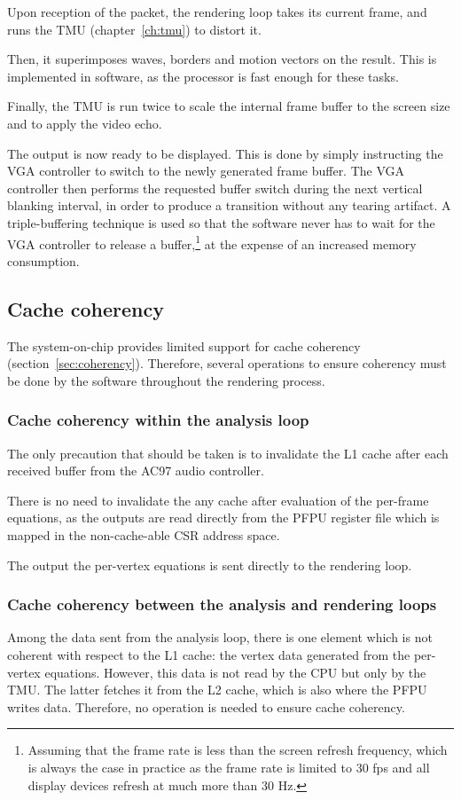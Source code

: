 \documentclass[a4paper,11pt]{kthesis}
\begin{document}
Upon reception of the packet, the rendering loop takes its current frame, and runs the TMU (chapter~\ref{ch:tmu}) to distort it.

Then, it superimposes waves, borders and motion vectors on the result. This is implemented in software, as the processor is fast enough for these tasks.

Finally, the TMU is run twice to scale the internal frame buffer to the screen size and to apply the video echo.

The output is now ready to be displayed. This is done by simply instructing the VGA controller to switch to the newly generated frame buffer. The VGA controller then performs the requested buffer switch during the next vertical blanking interval, in order to produce a transition without any tearing artifact. A triple-buffering technique is used so that the software never has to wait for the VGA controller to release a buffer,\footnote{Assuming that the frame rate is less than the screen refresh frequency, which is always the case in practice as the frame rate is limited to 30 fps and all display devices refresh at much more than 30 Hz.} at the expense of an increased memory consumption.

\subsection{Cache coherency}
The system-on-chip provides limited support for cache coherency (section~\ref{sec:coherency}). Therefore, several operations to ensure coherency must be done by the software throughout the rendering process.

\subsubsection{Cache coherency within the analysis loop}
The only precaution that should be taken is to invalidate the L1 cache after each received buffer from the AC97 audio controller.

There is no need to invalidate the any cache after evaluation of the per-frame equations, as the outputs are read directly from the PFPU register file which is mapped in the non-cache-able CSR address space.

The output the per-vertex equations is sent directly to the rendering loop.

\subsubsection{Cache coherency between the analysis and rendering loops}
Among the data sent from the analysis loop, there is one element which is not coherent with respect to the L1 cache: the vertex data generated from the per-vertex equations. However, this data is not read by the CPU but only by the TMU. The latter fetches it from the L2 cache, which is also where the PFPU writes data. Therefore, no operation is needed to ensure cache coherency.
\end{document}
